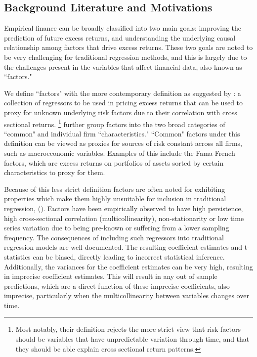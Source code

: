 \documentclass[11pt, a4paper, table]{article}
\begin{document}
\subsection{Background Literature and Motivations}

Empirical finance can be broadly classified into two main goals: improving the prediction of future excess returns, and understanding the underlying causal relationship among factors that drive excess returns. These two goals are noted to be very challenging for traditional regression methods, and this is largely due to the challenges present in the variables that affect financial data, also known as ``factors." 

We define ``factors" with the more contemporary definition as suggested by \cite{harvey__2016}: a collection of regressors to be used in pricing excess returns that can be used to proxy for unknown underlying risk factors due to their correlation with cross sectional returns. \footnote{Most notably, their definition rejects the more strict view that risk factors should be variables that have unpredictable variation through time, and that they should be able explain cross sectional return patterns.} \cite{harvey__2016} further group factors into the two broad categories of ``common" and individual firm ``characteristics." ``Common" factors under this definition can be viewed as proxies for sources of risk constant across all firms, such as macroeconomic variables. Examples of this include the Fama-French factors, which are excess returns on portfolios of assets sorted by certain characteristics to proxy for them. 

Because of this less strict definition factors are often noted for exhibiting properties which make them highly unsuitable for inclusion in traditional regression, (\cite{harvey__2016}). Factors have been empirically observed to have high persistence, high cross-sectional correlation (multicollinearity), non-stationarity or low time series variation due to being pre-known or suffering from a lower sampling frequency. The consequences of including such regressors into traditional regression models are well documented. The resulting coefficient estimates and t-statistics can be biased, directly leading to incorrect statistical inference. Additionally, the variances for the coefficient estimates can be very high, resulting in imprecise coefficient estimates. This will result in any out of sample predictions, which are a direct function of these imprecise coefficients, also imprecise, particularly when the multicollinearity between variables changes over time.
\end{document}
